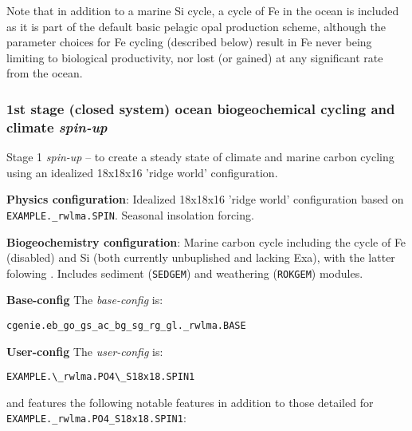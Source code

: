 \documentclass[10pt,twoside]{article}
\begin{document}
Note that in addition to a marine Si cycle, a cycle of Fe in the ocean is included as it is part of the default basic pelagic opal production scheme, although the parameter choices for Fe cycling (described below) result in Fe never being limiting to biological productivity, nor lost (or gained) at any significant rate from the ocean.


\subsubsection{1st stage (closed system) ocean biogeochemical cycling and climate \textit{spin-up}}\label{EXAMPLE.rwlma.PO4S18x18.SPIN1}

Stage 1 \textit{spin-up} -- to create a steady state of climate and marine carbon cycling using an idealized 18x18x16 'ridge world' configuration.

\noindent \textbf{Physics configuration}: Idealized 18x18x16 'ridge world' configuration based on \texttt{EXAMPLE.\_rwlma.SPIN}. Seasonal insolation forcing.

\noindent \textbf{Biogeochemistry configuration}: Marine carbon cycle including the cycle of Fe (disabled) and Si (both currently unbuplished and lacking Exa), with the latter folowing . Includes sediment (\texttt{SEDGEM}) and weathering (\texttt{ROKGEM}) modules.

\noindent \textbf{Base-config} The \textit{base-config} is:
\vspace{-10pt}\begin{verbatim}cgenie.eb_go_gs_ac_bg_sg_rg_gl._rwlma.BASE\end{verbatim}\vspace{-10pt}

\noindent \textbf{User-config} The \textit{user-config} is:
\vspace{-10pt}\begin{verbatim}EXAMPLE.\_rwlma.PO4\_S18x18.SPIN1\end{verbatim}\vspace{-10pt}
and features the following notable features in addition to those detailed for \texttt{EXAMPLE.\_rwlma.PO4\_S18x18.SPIN1}:
\end{document}
